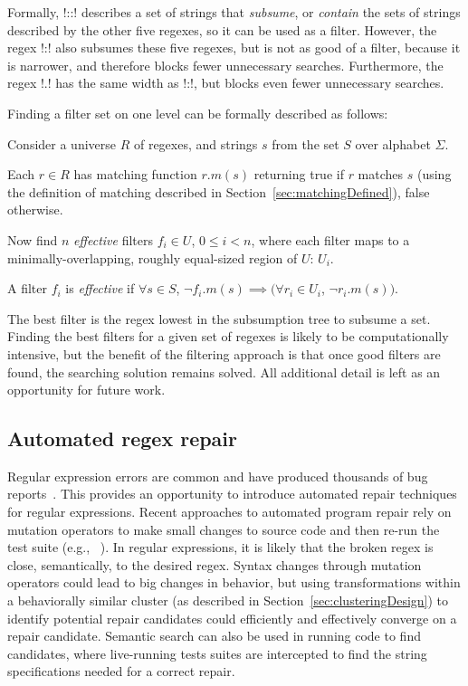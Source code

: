 Formally, \cverb!::! describes a set of strings that \emph{subsume}, or \emph{contain} the sets of strings described by the other five regexes, so it can be used as a filter.  However, the regex \cverb!:! also subsumes these five regexes, but is not as good of a filter, because it is narrower, and therefore blocks fewer unnecessary searches.   Furthermore, the regex \cverb!.! has the same width as \cverb!:!, but blocks even fewer unnecessary searches.

Finding a filter set on one level can be formally described as follows:

Consider a universe $R$ of regexes, and strings $s$ from the set $S$ over alphabet $\Sigma$.

Each $r\in R$ has matching function $r.m(s)$ returning true if $r$ matches $s$ (using the definition of matching described in Section~\ref{sec:matchingDefined}), false otherwise.

Now find $n$ \emph{effective} filters $f_i \in U$, $ 0\leq i< n$, where each filter maps to a minimally-overlapping, roughly equal-sized region of $U$: $U_i$.

A filter $f_i$ is \emph{effective} if $\forall s\in S$, $ \neg f_i.m(s) \implies (\forall r_i \in U_i$, $ \neg r_i.m(s))$.

The best filter is the regex lowest in the subsumption tree to subsume a set.  Finding the best filters for a given set of regexes is likely to be computationally intensive, but the benefit of the filtering approach is that once good filters are found, the searching solution remains solved.  All additional detail is left as an opportunity for future work.

\subsection{Automated regex repair}  Regular expression errors are common and have produced thousands of bug reports~. This provides an opportunity to introduce automated repair techniques for regular expressions.
Recent approaches to automated program repair rely on mutation operators to make small changes to source code and then re-run the test suite (e.g., ~). In regular expressions, it is likely that the broken regex is close, semantically, to the desired regex. Syntax changes through mutation operators could lead to big changes in behavior, but using transformations within a behaviorally similar cluster (as described in Section~\ref{sec:clusteringDesign}) to identify potential repair candidates could efficiently and effectively converge on a repair candidate.  Semantic search can also be used in running code to find candidates, where live-running tests suites are intercepted to find the string specifications needed for a correct repair.


